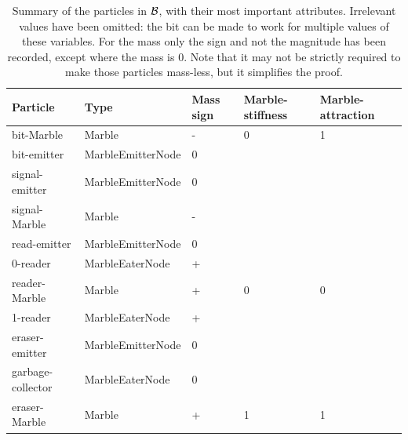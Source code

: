 \begin{table}[h]
    \begin{tabular}{l|l|l|l|l}
    \textbf{Particle} & \textbf{Type} & \textbf{Mass sign} & \textbf{Marble-stiffness} & \textbf{Marble-attraction} \\ \hline
    bit-Marble        & Marble            & - & 0 & 1 \\
    bit-emitter       & MarbleEmitterNode & 0 &   &   \\
    signal-emitter    & MarbleEmitterNode & 0 &   &   \\
    signal-Marble     & Marble            & - &   &   \\
    read-emitter      & MarbleEmitterNode & 0 &   &   \\
    0-reader          & MarbleEaterNode   & + &   &   \\
    reader-Marble     & Marble            & + & 0 & 0 \\
    1-reader          & MarbleEaterNode   & + &   &   \\
    eraser-emitter    & MarbleEmitterNode & 0 &   &   \\
    garbage-collector & MarbleEaterNode   & 0 &   &   \\
    eraser-Marble     & Marble            & + & 1 & 1
    \end{tabular}
    \caption{Summary of the particles in $\mathcal{B}$, with their most important attributes. 
    Irrelevant values have been omitted: the bit can be made to work for multiple values of these variables. For the mass only the sign and not the magnitude has been recorded, except where the mass is 0. Note that it may not be strictly required to make those particles mass-less, but it simplifies the proof.}
    \label{table:bit}
\end{table}


